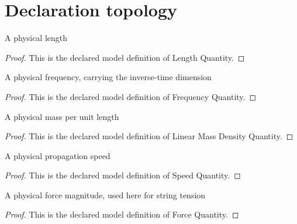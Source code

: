 \section{Declaration topology}
\begin{definition}
  \label{def:physics:phyx-mini-0295:phyxminiproblems-problemphyxmini0295-lengthquantity}
  A physical length
\end{definition}
\begin{proof}
  This is the declared model definition of Length Quantity.
\end{proof}
\begin{definition}
  \label{def:physics:phyx-mini-0295:phyxminiproblems-problemphyxmini0295-frequencyquantity}
  A physical frequency, carrying the inverse-time dimension
\end{definition}
\begin{proof}
  This is the declared model definition of Frequency Quantity.
\end{proof}
\begin{definition}
  \label{def:physics:phyx-mini-0295:phyxminiproblems-problemphyxmini0295-linearmassdensityquantity}
  A physical mass per unit length
\end{definition}
\begin{proof}
  This is the declared model definition of Linear Mass Density Quantity.
\end{proof}
\begin{definition}
  \label{def:physics:phyx-mini-0295:phyxminiproblems-problemphyxmini0295-speedquantity}
  A physical propagation speed
\end{definition}
\begin{proof}
  This is the declared model definition of Speed Quantity.
\end{proof}
\begin{definition}
  \label{def:physics:phyx-mini-0295:phyxminiproblems-problemphyxmini0295-forcequantity}
  A physical force magnitude, used here for string tension
\end{definition}
\begin{proof}
  This is the declared model definition of Force Quantity.
\end{proof}
